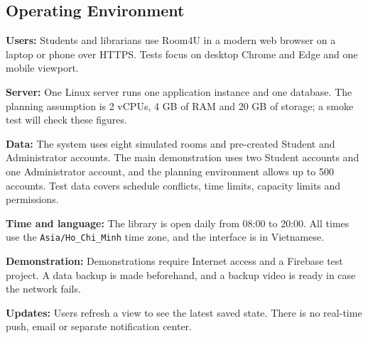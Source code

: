 \subsection{Operating Environment}

\textbf{Users:} Students and librarians use Room4U in a modern web browser on a laptop or phone over HTTPS. Tests focus on desktop Chrome and Edge and one mobile viewport.\par
\textbf{Server:} One Linux server runs one application instance and one database. The planning assumption is 2 vCPUs, 4 GB of RAM and 20 GB of storage; a smoke test will check these figures.\par
\textbf{Data:} The system uses eight simulated rooms and pre-created Student and Administrator accounts. The main demonstration uses two Student accounts and one Administrator account, and the planning environment allows up to 500 accounts. Test data covers schedule conflicts, time limits, capacity limits and permissions.\par
\textbf{Time and language:} The library is open daily from 08:00 to 20:00. All times use the \texttt{Asia/Ho\_Chi\_Minh} time zone, and the interface is in Vietnamese.\par
\textbf{Demonstration:} Demonstrations require Internet access and a Firebase test project. A data backup is made beforehand, and a backup video is ready in case the network fails.\par
\textbf{Updates:} Users refresh a view to see the latest saved state. There is no real-time push, email or separate notification center.

